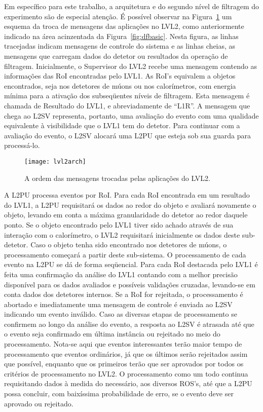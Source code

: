 Em específico para este trabalho, a arquitetura e  do
segundo nível de filtragem do experimento são de especial atenção. É possível
observar na Figura~\ref{fig:lvl2arch} um esquema da troca de mensagens das
aplicações no LVL2, como anteriormente indicado na área acinzentada da
Figura~\ref{fig:dfbasic}. Nesta figura, as linhas tracejadas indicam mensagens
de controle do sistema e as linhas cheias, as mensagens que carregam dados do
detetor ou resultados da operação de filtragem. Inicialmente, o Supervisor do
LVL2 recebe uma mensagem contendo as informações das RoI encontradas pelo
LVL1. As RoI's equivalem a objetos encontrados, seja nos detetores de múons ou
nos calorímetros, com energia mínima para a ativação dos subseqüentes níveis
de filtragem. Esta mensagem é chamada de Resultado do LVL1, e abreviadamente
de ``L1R''. A mensagem que chega ao L2SV representa, portanto, uma avaliação
do evento com uma qualidade equivalente à visibilidade que o LVL1 tem do
detetor. Para continuar com a avaliação do evento, o L2SV alocará uma L2PU que
esteja sob sua guarda para processá-lo.

\begin{figure}
\begin{center}
\texttt{[image: lvl2arch]}
\end{center}
\caption{A ordem das mensagens trocadas pelas aplicações do LVL2.}
\label{fig:lvl2arch}
\end{figure}

A L2PU processa eventos por RoI. Para cada RoI encontrada em um resultado do
LVL1, a L2PU requisitará os dados ao redor do objeto e avaliará novamente o
objeto, levando em conta a máxima granularidade do detetor ao redor daquele
ponto. Se o objeto encontrado pelo LVL1 tiver sido achado através de sua
interação com o calorímetro, o LVL2 requisitará inicialmente os dados deste
sub-detetor. Caso o objeto tenha sido encontrado nos detetores de múons, o
processamento começará a partir deste sub-sistema. O processamento de cada
evento na L2PU se dá de forma seqüencial. Para cada RoI destacada pelo LVL1 é
feita uma confirmação da análise do LVL1 contando com a melhor precisão
disponível para os dados avaliados e possíveis validações cruzadas, levando-se
em conta dados dos detetores internos. Se a RoI for rejeitada, o processamento
é abortado e imediatamente uma mensagem de controle é enviada ao L2SV
indicando um evento inválido. Caso as diversas etapas de processamento se
confirmem ao longo da análise do evento, a resposta ao L2SV é atrasada até que
o evento seja confirmado em última instância ou rejeitado no meio do
processamento. Nota-se aqui que eventos interessantes terão maior tempo de
processamento que eventos ordinários, já que os últimos serão rejeitados assim
que possível, enquanto que os primeiros terão que ser aprovados por todos os
critérios de processamento no LVL2. O processamento como um todo continua
requisitando dados à medida do necessário, aos diversos ROS's, até que a L2PU
possa concluir, com baixíssima probabilidade de erro, se o evento deve ser
aprovado ou rejeitado.

